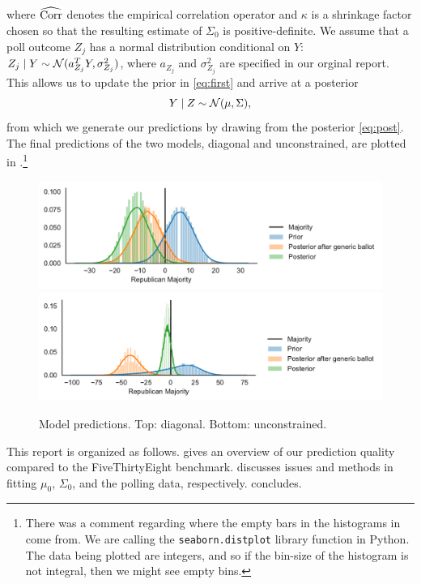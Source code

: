 \documentclass[12pt]{article}
\newcommand{\cm}{{\color{Red}{\textsf{[C]}}}}
\begin{document}
where $\widehat{\operatorname{Corr}}$ denotes the empirical correlation operator and $\kappa$ is a shrinkage factor chosen so that the resulting estimate of $\Sigma_0$ is positive-definite. We assume that a poll outcome $Z_j$ has a normal distribution conditional on $Y$: $Z_j \mid Y \sim \mathcal{N}(a_{Z_j}^T Y, \sigma_{Z_j}^2)$, where $a_{Z_j}$ and $\sigma_{Z_j}^2$ are specified in our orginal report. This allows us to update the prior in \eqref{eq:first} and arrive at a posterior \begin{equation}
  Y \mid Z \sim \mathcal{N}(\mu, \Sigma),
  \label{eq:post}
\end{equation}
from which we generate our predictions by drawing from the posterior \eqref{eq:post}. The final predictions of the two models, diagonal and unconstrained, are plotted in .\footnote{\cm{} There was a comment regarding where the empty bars in the histograms in  come from. We are calling the \texttt{seaborn.distplot} library function in Python. The data being plotted are integers, and so if the bin-size of the histogram is not integral, then we might see empty bins. }
\begin{figure}[tb]
  \centering
  \includegraphics[width=.7\textwidth]{rep_seats_with_diagonal_prior.pdf}
  \includegraphics[width=.7\textwidth]{rep_seats.pdf}
  \caption{Model predictions. Top: diagonal. Bottom: unconstrained. }
  \label{fig:model}
\end{figure}

This report is organized as follows.  gives an overview of our prediction quality compared to the FiveThirtyEight benchmark.  discusses issues and methods in fitting $\mu_0$, $\Sigma_0$, and the polling data, respectively.  concludes.
\end{document}
